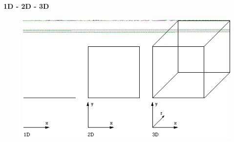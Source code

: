 \documentclass{article}
\begin{document}
\paragraph{1D - 2D - 3D}
 \par\leavevmode\par
\begin{figure}[h!]
\centering
\includegraphics[scale=0.3]{./images/2-3d.png}
\end{figure}\hfill 
\newpage
\end{document}
